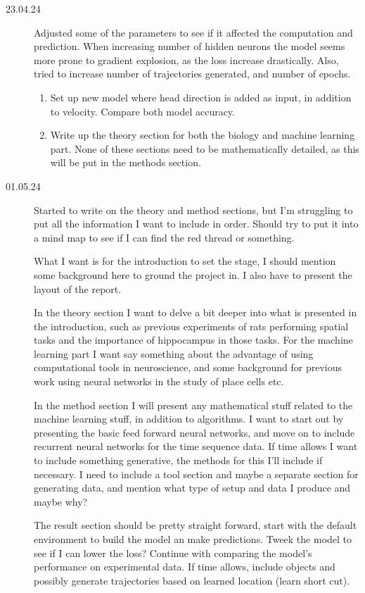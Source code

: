 \begin{description}
    \item[23.04.24] Adjusted some of the parameters to see if it affected the computation and prediction. When increasing number of hidden neurons the model seems more prone to gradient explosion, as the loss increase drastically. Also, tried to increase number of trajectories generated, and number of epochs.

    \begin{enumerate}
        \item Set up new model where head direction is added as input, in addition to velocity. Compare both model accuracy.
        \item Write up the theory section for both the biology and machine learning part. None of these sections need to be mathematically detailed, as this will be put in the methods section.
    \end{enumerate}

    \item[01.05.24] Started to write on the theory and method sections, but I'm struggling to put all the information I want to include in order. Should try to put it into a mind map to see if I can find the red thread or something.

    What I want is for the introduction to set the stage, I should mention some background here to ground the project in. I also have to present the layout of the report. 

    In the theory section I want to delve a bit deeper into what is presented in the introduction, such as previous experiments of rats performing spatial tasks and the importance of hippocampus in those tasks. For the machine learning part I want say something about the advantage of using computational tools in neuroscience, and some background for previous work using neural networks in the study of place cells etc.

    In the method section I will present any mathematical stuff related to the machine learning stuff, in addition to algorithms. I want to start out by presenting the basic feed forward neural networks, and move on to include recurrent neural networks for the time sequence data. If time allows I want to include something generative, the methods for this I'll include if necessary. I need to include a tool section and maybe a separate section for generating data, and mention what type of setup and data I produce and maybe why?

    The result section should be pretty straight forward, start with the default environment to build the model an make predictions. Tweek the model to see if I can lower the loss? Continue with comparing the model's performance on experimental data. If time allows, include objects and possibly generate trajectories based on learned location (learn short cut).


\end{description}
